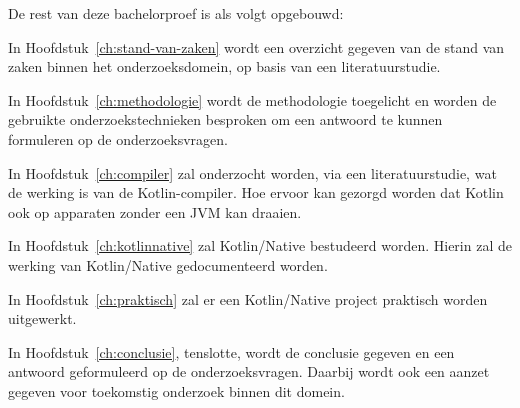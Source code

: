 De rest van deze bachelorproef is als volgt opgebouwd:

In Hoofdstuk~\ref{ch:stand-van-zaken} wordt een overzicht gegeven van de stand van zaken binnen het onderzoeksdomein, op basis van een literatuurstudie.

In Hoofdstuk~\ref{ch:methodologie} wordt de methodologie toegelicht en worden de gebruikte onderzoekstechnieken besproken om een antwoord te kunnen formuleren op de onderzoeksvragen.

In Hoofdstuk~\ref{ch:compiler} zal onderzocht worden, via een literatuurstudie, wat de werking is van de Kotlin-compiler. Hoe ervoor kan gezorgd worden dat Kotlin ook op apparaten zonder een JVM kan draaien.

In Hoofdstuk~\ref{ch:kotlinnative} zal Kotlin/Native bestudeerd worden. Hierin zal de werking van Kotlin/Native gedocumenteerd worden.

In Hoofdstuk~\ref{ch:praktisch} zal er een Kotlin/Native project praktisch worden uitgewerkt.

In Hoofdstuk~\ref{ch:conclusie}, tenslotte, wordt de conclusie gegeven en een antwoord geformuleerd op de onderzoeksvragen. Daarbij wordt ook een aanzet gegeven voor toekomstig onderzoek binnen dit domein.

